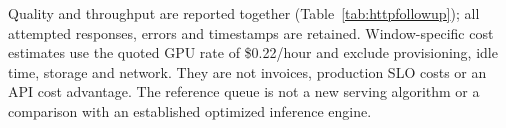Quality and throughput are reported together (Table~\ref{tab:httpfollowup});
all attempted responses, errors and timestamps are retained. Window-specific
cost estimates use the quoted GPU rate of \$0.22/hour and exclude provisioning,
idle time, storage and network. They are not invoices, production SLO costs or
an API cost advantage. The reference queue is not a new serving algorithm or
a comparison with an established optimized inference engine.

